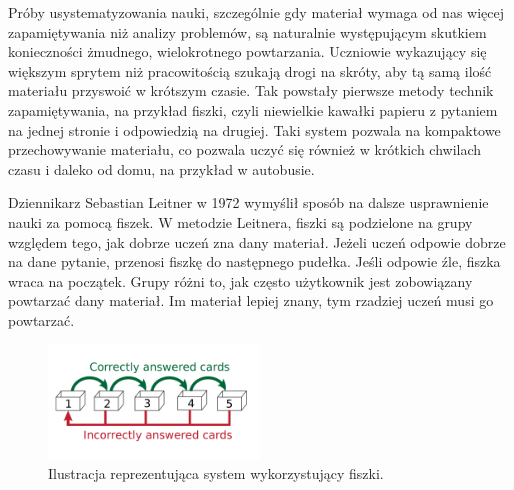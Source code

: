 \documentclass[a4paper,twoside,12pt]{book}
\begin{document}




Próby usystematyzowania nauki, szczególnie gdy materiał wymaga od nas więcej zapamiętywania niż analizy problemów, są naturalnie występującym skutkiem konieczności żmudnego, wielokrotnego powtarzania. Uczniowie wykazujący się większym sprytem niż pracowitością szukają drogi na skróty, aby tą samą ilość materiału przyswoić w krótszym czasie. Tak powstały pierwsze metody technik zapamiętywania, na przykład fiszki, czyli niewielkie kawałki papieru z pytaniem na jednej stronie i odpowiedzią na drugiej. Taki system pozwala na kompaktowe przechowywanie materiału, co pozwala uczyć się również w krótkich chwilach czasu i daleko od domu, na przykład w autobusie. 

Dziennikarz Sebastian Leitner w 1972 wymyślił sposób na dalsze usprawnienie nauki za pomocą fiszek. W metodzie Leitnera, fiszki są podzielone na grupy względem tego, jak dobrze uczeń zna dany materiał. Jeżeli uczeń odpowie dobrze na dane pytanie, przenosi fiszkę do następnego pudełka. Jeśli odpowie źle, fiszka wraca na początek. Grupy różni to, jak często użytkownik jest zobowiązany powtarzać dany materiał. Im materiał lepiej znany, tym rzadziej uczeń musi go powtarzać. 
\begin{figure}[H]
\centering
\includegraphics[width=0.5\textwidth]{leitner_system}
\caption{Ilustracja reprezentująca system wykorzystujący fiszki.}
\label{fig:etykieta-rysunku}
\end{figure}
\end{document}
